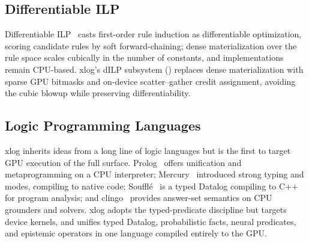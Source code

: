 \subsection{Differentiable ILP}

Differentiable ILP~\cite{dilp} casts first-order rule induction as differentiable optimization, scoring candidate rules by soft forward-chaining; dense materialization over the rule space scales cubically in the number of constants, and implementations remain CPU-based. xlog's dILP subsystem () replaces dense materialization with sparse GPU bitmasks and on-device scatter--gather credit assignment, avoiding the cubic blowup while preserving differentiability.

\subsection{Logic Programming Languages}

xlog inherits ideas from a long line of logic languages but is the first to target GPU execution of the full surface. Prolog~\cite{swiprolog} offers unification and metaprogramming on a CPU interpreter; Mercury~\cite{mercury} introduced strong typing and modes, compiling to native code; Souffl{\'e}~\cite{souffle} is a typed Datalog compiling to C++ for program analysis; and clingo~\cite{clingo} provides answer-set semantics on CPU grounders and solvers. xlog adopts the typed-predicate discipline but targets device kernels, and unifies typed Datalog, probabilistic facts, neural predicates, and epistemic operators in one language compiled entirely to the GPU.
